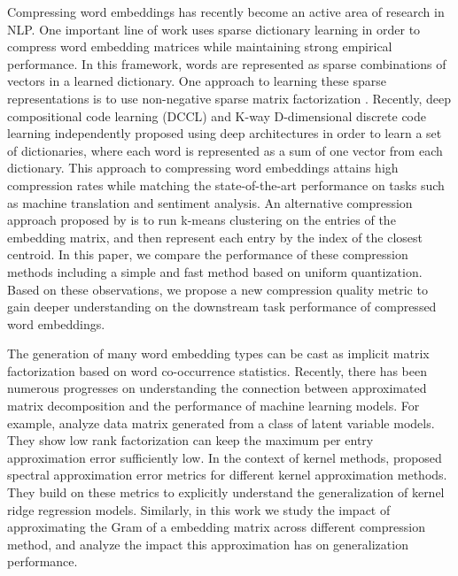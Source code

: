 Compressing word embeddings has recently become an active area of research in NLP.
One important line of work uses sparse dictionary learning in order to compress word embedding matrices while maintaining strong empirical performance.
In this framework, words are represented as sparse combinations of vectors in a learned dictionary.
One approach to learning these sparse representations is to use non-negative sparse matrix factorization \citep{murphy12,sparse16}.
Recently, deep compositional code learning (DCCL) \cite{dccl17} and K-way D-dimensional discrete code learning \cite{kway18} independently proposed using deep architectures in order to learn a set of dictionaries, where each word is represented as a sum of one vector from each dictionary.
This approach to compressing word embeddings attains high compression rates while matching the state-of-the-art performance on tasks such as machine translation and sentiment analysis.
An alternative compression approach proposed by \citet{andrews16} is to run k-means clustering on the entries of the embedding matrix, and then represent each entry by the index of the closest centroid.
In this paper, we compare the performance of these compression methods including a simple and fast method based on uniform quantization. Based on these observations, we propose a new compression quality metric to gain deeper understanding on the downstream task performance of compressed word embeddings.

The generation of many word embedding types \cite{levy14, levy15} can be cast as implicit matrix factorization based on word co-occurrence statistics. Recently, there has been numerous progresses on understanding the connection between approximated matrix decomposition and the performance of machine learning models. For example, \citet{udell2017big} analyze data matrix generated from a class of latent variable models. They show low rank factorization can keep the maximum per entry approximation error sufficiently low. In the context of kernel methods, \citet{avron17, lprff18} proposed spectral approximation error metrics for different kernel approximation methods. They build on these metrics to explicitly understand the generalization of kernel ridge regression models.
Similarly, in this work we study the impact of approximating the Gram of a embedding matrix across different compression method, and analyze the impact this approximation has on generalization performance. 

